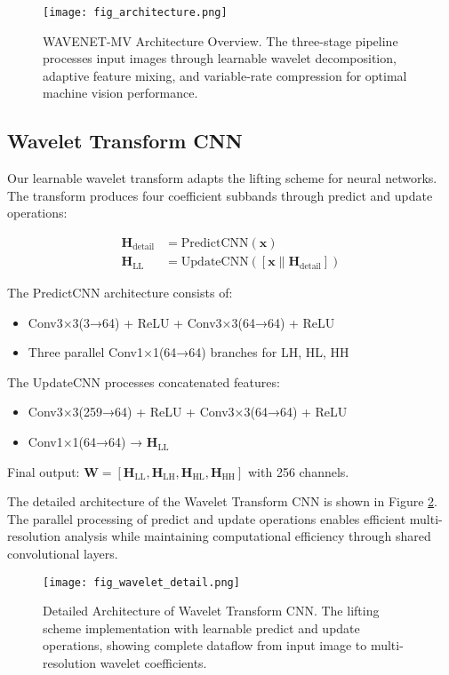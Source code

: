 \documentclass[conference]{IEEEtran}
\begin{document}
\begin{figure}[htbp]
\centering
\texttt{[image: fig\_architecture.png]}
\caption{WAVENET-MV Architecture Overview. The three-stage pipeline processes input images through learnable wavelet decomposition, adaptive feature mixing, and variable-rate compression for optimal machine vision performance.}
\label{fig:architecture}
\end{figure}

\subsection{Wavelet Transform CNN}

Our learnable wavelet transform adapts the lifting scheme \cite{daubechies1998factoring} for neural networks. The transform produces four coefficient subbands through predict and update operations:

\begin{align}
\mathbf{H}_{\text{detail}} &= \text{PredictCNN}(\mathbf{x}) \\
\mathbf{H}_{\text{LL}} &= \text{UpdateCNN}([\mathbf{x} \| \mathbf{H}_{\text{detail}}])
\end{align}

The PredictCNN architecture consists of:
\begin{itemize}
\item Conv3×3(3→64) + ReLU + Conv3×3(64→64) + ReLU
\item Three parallel Conv1×1(64→64) branches for LH, HL, HH
\end{itemize}

The UpdateCNN processes concatenated features:
\begin{itemize}
\item Conv3×3(259→64) + ReLU + Conv3×3(64→64) + ReLU
\item Conv1×1(64→64) → $\mathbf{H}_{\text{LL}}$
\end{itemize}

Final output: $\mathbf{W} = [\mathbf{H}_{\text{LL}}, \mathbf{H}_{\text{LH}}, \mathbf{H}_{\text{HL}}, \mathbf{H}_{\text{HH}}]$ with 256 channels.

The detailed architecture of the Wavelet Transform CNN is shown in Figure \ref{fig:wavelet_detail}. The parallel processing of predict and update operations enables efficient multi-resolution analysis while maintaining computational efficiency through shared convolutional layers.

\begin{figure}[htbp]
\centering
\texttt{[image: fig\_wavelet\_detail.png]}
\caption{Detailed Architecture of Wavelet Transform CNN. The lifting scheme implementation with learnable predict and update operations, showing complete dataflow from input image to multi-resolution wavelet coefficients.}
\label{fig:wavelet_detail}
\end{figure}
\end{document}
